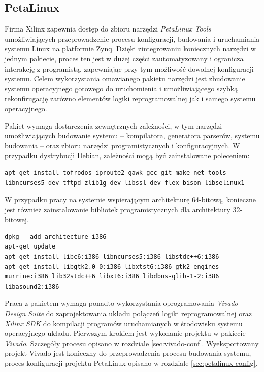 \subsection{PetaLinux}
Firma Xilinx zapewnia dostęp do zbioru narzędzi \emph{PetaLinux Tools} \cite{petalinux-tools} umożliwiających przeprowadzenie procesu konfiguracji, budowania i uruchamiania systemu Linux na platformie Zynq. 
Dzięki zintegrowaniu koniecznych narzędzi w jednym pakiecie, proces ten jest w dużej części zautomatyzowany i ogranicza interakcję z programistą, zapewniając przy tym możliwość dowolnej konfiguracji systemu.
Celem wykorzystania omawianego pakietu narzędzi jest zbudowanie systemu operacyjnego gotowego do uruchomienia i umożliwiającego szybką rekonfirugację zarówno elementów logiki reprogramowalnej jak i samego systemu operacyjnego.

Pakiet wymaga dostarczenia zewnętrznych zależności, w tym narzędzi umożliwiających budowanie systemu -- kompilatora, generatora parserów, systemu budowania -- oraz zbioru narzędzi programistycznych i konfiguracyjnych.
W przypadku dystrybucji Debian, zależności mogą być zainstalowane poleceniem:

\begin{lstlisting}[breaklines=true]
apt-get install tofrodos iproute2 gawk gcc git make net-tools libncurses5-dev tftpd zlib1g-dev libssl-dev flex bison libselinux1
\end{lstlisting}

W przypadku pracy na systemie wspierającym architekturę 64-bitową, konieczne jest również zainstalowanie bibliotek programistycznych dla architektury 32-bitowej.

\begin{lstlisting}[breaklines=true]
dpkg --add-architecture i386
apt-get update
apt-get install libc6:i386 libncurses5:i386 libstdc++6:i386
apt-get install libgtk2.0-0:i386 libxtst6:i386 gtk2-engines-murrine:i386 lib32stdc++6 libxt6:i386 libdbus-glib-1-2:i386 libasound2:i386
\end{lstlisting}

Praca z pakietem wymaga ponadto wykorzystania oprogramowania \emph{Vivado Design Suite} \cite{vivado-home} do zaprojektowania układu połączeń logiki reprogramowalnej oraz \emph{Xilinx SDK} \cite{xsdk-home} do kompilacji programów uruchamianych w środowisku systemu operacyjnego układu.
Pierwszym krokiem jest wykonanie projektu w pakiecie \emph{Vivado}. 
Szczegóły procesu opisano w rozdziale \ref{sec:vivado-conf}. 
Wyeksportowany projekt Vivado jest konieczny do przeprowadzenia procesu budowania systemu, proces konfiguracji projektu PetaLinux opisano w rozdziale \ref{sec:petalinux-config}. 

